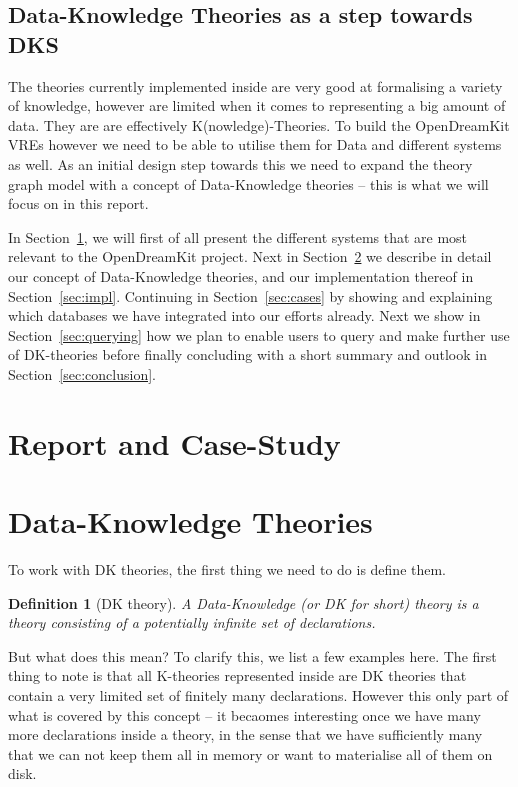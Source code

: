 \documentclass{deliverablereport}
\newtheorem{mydef}{Definition}
\begin{document}
\subsection{Data-Knowledge Theories as a step towards DKS}\label{sec:introfinal}

The theories currently implemented inside \MMT are very good at formalising a variety of knowledge, however are limited when it comes to representing a big amount of data. They are are effectively K(nowledge)-Theories. To build the OpenDreamKit VREs however we need to be able to utilise them for Data and different systems as well. As an initial design step towards this we need to expand the theory graph model with a concept of Data-Knowledge theories -- this is what we will focus on in this report.

In Section~\ref{casestudy}, we will first of all present the different systems that are most relevant to the OpenDreamKit project. Next in Section~\ref{sec:data} we describe in detail our concept of Data-Knowledge theories, and our implementation thereof in Section~\ref{sec:impl}. Continuing in Section~\ref{sec:cases} by showing and explaining which databases we have integrated into our efforts already. Next we show in Section~\ref{sec:querying} how we plan to enable users to query and make further use of DK-theories before finally concluding with a short summary and outlook in Section~\ref{sec:conclusion}.

\section{Report and Case-Study}\label{casestudy}

\section{Data-Knowledge Theories}\label{sec:data}

To work with DK theories, the first thing we need to do is define them.
\begin{mydef}[DK theory]
  A Data-Knowledge (or DK for short) theory is a theory consisting of a potentially infinite set of declarations.
\end{mydef}

But what does this mean? To clarify this, we list a few examples here. The first thing to note is that all K-theories represented inside \MMT are DK theories that contain a very limited set of finitely many declarations. However this only part of what is covered by this concept -- it becaomes interesting once we have many more declarations inside a theory, in the sense that we have sufficiently many that we can not keep them all in memory or want to materialise all of them on disk.
\end{document}
